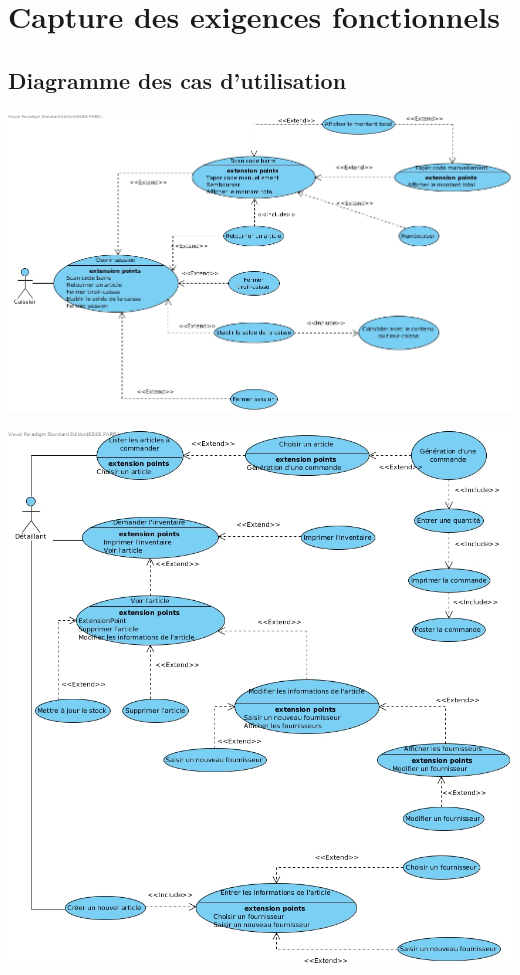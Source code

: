 \chapter{Capture des exigences fonctionnels}

\section{Diagramme des cas d'utilisation}
\begin{center}
	\includegraphics[width=14cm]{DiagrammeUseCaseCaisser.jpg}
\end{center}

\begin{center}
	\includegraphics[width=14cm]{DiagrammeUseCaseDetaillant.jpg}
\end{center}

